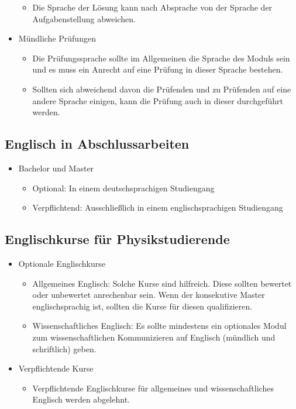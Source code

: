 \documentclass[DIV=calc]{scrartcl}
\begin{document}
\begin{itemize}
\begin{itemize}
        \item Die Sprache der Lösung kann nach Absprache von der Sprache der Aufgabenstellung abweichen.
    \end{itemize}
    \item Mündliche Prüfungen
    \begin{itemize}
        \item Die Prüfungssprache sollte im Allgemeinen die Sprache des Moduls sein und es muss ein Anrecht auf eine Prüfung in dieser Sprache bestehen. 
        \item Sollten sich abweichend davon die Prüfenden und zu Prüfenden auf eine andere Sprache einigen, kann die Prüfung auch in dieser durchgeführt werden.
    \end{itemize}
\end{itemize}

\subsection*{Englisch in Abschlussarbeiten}
\begin{itemize}
    \item Bachelor und Master
    \begin{itemize}
        \item Optional: In einem deutschsprachigen Studiengang
        \item Verpflichtend: Ausschließlich in einem englischsprachigen Studiengang
    \end{itemize}
    
\end{itemize}

\subsection*{Englischkurse für Physikstudierende}
\begin{itemize}
    \item Optionale Englischkurse
    \begin{itemize}
        \item Allgemeines Englisch: Solche Kurse sind hilfreich. Diese sollten bewertet oder unbewertet anrechenbar sein. Wenn der konsekutive Master englischsprachig ist, sollten die Kurse für diesen qualifizieren.
        \item Wissenschaftliches Englisch: Es sollte mindestens ein optionales Modul zum wissenschaftlichen Kommunizieren auf Englisch (mündlich und schriftlich) geben.
    \end{itemize}
    \item Verpflichtende Kurse
    \begin{itemize}
        \item Verpflichtende Englischkurse für allgemeines und wissenschaftliches Englisch werden abgelehnt.
    \end{itemize}
\end{itemize}
\end{document}
